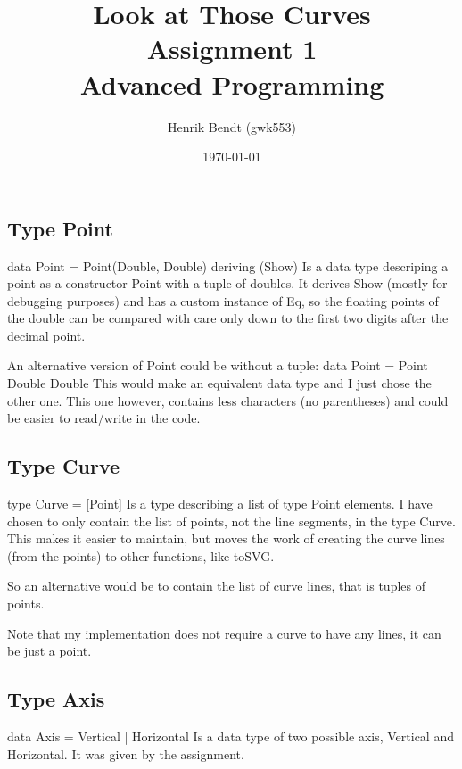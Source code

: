 \documentclass[a4paper, 10pt]{article}
\author{Henrik Bendt (gwk553)}
\title{Look at Those Curves\\Assignment 1\\Advanced Programming}
\date{\today}
\renewenvironment{verbatim}{}{}
\begin{document}
\maketitle
\pagebreak

\subsection*{Type Point}
\begin{verbatim}
\begin{verbatim}
data Point = Point(Double, Double)
    deriving (Show)
\end{verbatim}
\end{verbatim}
Is a data type descriping a point as a constructor Point with a tuple of doubles.
It derives Show (mostly for debugging purposes) and has a custom instance of Eq, so the floating points of the double can be compared with care only down to the first two digits after the decimal point.

An alternative version of Point could be without a tuple:
data Point = Point Double Double
This would make an equivalent data type and I just chose the other one. This one however, contains less characters (no parentheses) and could be easier to read/write in the code.

\subsection*{Type Curve}
\begin{verbatim}
\begin{verbatim}
type Curve = [Point]
\end{verbatim}
\end{verbatim}
Is a type describing a list of type Point elements. I have chosen to only contain the list of points, not the line segments, in the type Curve. This makes it easier to maintain, but moves the work of creating the curve lines (from the points) to other functions, like toSVG. 

So an alternative would be to contain the list of curve lines, that is tuples of points.

Note that my implementation does not require a curve to have any lines, it can be just a point.

\subsection*{Type Axis}
\begin{verbatim}
\begin{verbatim}
data Axis = Vertical | Horizontal
\end{verbatim}
\end{verbatim}
Is a data type of two possible axis, Vertical and Horizontal. It was given by the assignment.
\end{document}
